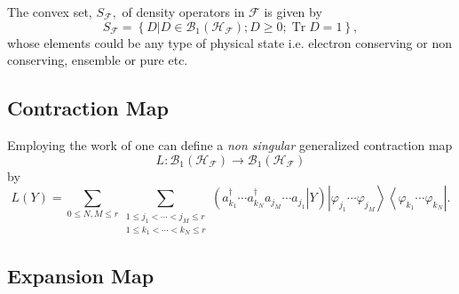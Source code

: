 \documentclass[aps,preprint]{revtex4}%
\begin{document}
The convex set, $S_{\mathcal{F}},$ of density operators in $\mathcal{F}$ is
given by
\begin{equation}
S_{\mathcal{F}}=\left\{  D\left\vert D\in\mathcal{B}_{1}\left(  \mathcal{H}%
_{\mathcal{F}}\right)  ;D\geq0;\operatorname{Tr}D=1\right.  \right\}  ,
\end{equation}
whose elements could be any type of physical state i.e. electron conserving or
non conserving, ensemble or pure etc.

\subsection{Contraction Map \label{Contraction}}

Employing the work of \cite{Kummar2} one can define a \emph{non singular
}generalized contraction map
\begin{equation}
L:\mathcal{B}_{1}\left(  \mathcal{H}_{\mathcal{F}}\right)  \rightarrow
\mathcal{B}_{1}\left(  \mathcal{H}_{\mathcal{F}}\right)
\end{equation}
by
\begin{equation}
L\left(  Y\right)  =\sum_{0\leq N,M\leq r}\sum_{\substack{1\leq j_{1}%
<\cdots<j_{M}\leq r\\1\leq k_{1}<\cdots<k_{N}\leq r}}\left(  \left.  a_{k_{1}%
}^{\dagger}\cdots a_{k_{N}}^{\dagger}a_{j_{M}}\cdots a_{j_{1}}\right\vert
Y\right)  \left\vert \varphi_{j_{1}}\cdots\varphi_{j_{M}}\right\rangle
\left\langle \varphi_{k_{1}}\cdots\varphi_{k_{N}}\right\vert . \label{CONT}%
\end{equation}


\subsection{Expansion Map \label{Expansion}}
\end{document}
